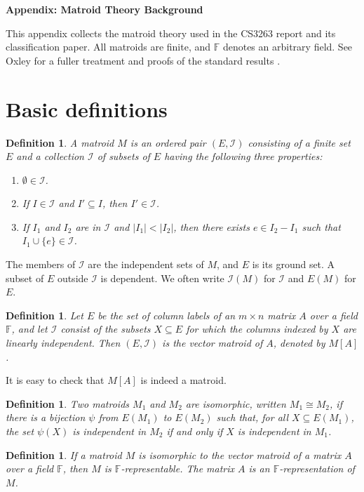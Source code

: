 \documentclass[11pt,letterpaper]{article}
\newcommand{\F}{\mathbb{F}}
\newcommand{\I}{\mathcal{I}}
\theoremstyle{appendix-result}
\theoremstyle{appendix-definition}
\newtheorem{definition}[theorem]{Definition}
\begin{document}
\begin{center}
    \Large\bfseries Appendix: Matroid Theory Background
\end{center}

This appendix collects the matroid theory used in the CS3263 report and its
classification paper. All matroids are finite, and \(\F\) denotes an arbitrary
field. See Oxley for a fuller treatment and proofs of the standard results
\cite{oxley-survey,oxley}.

\section{Basic definitions}
\begin{definition}
    A matroid $M$ is an ordered pair $(E, \I)$ consisting of a finite set $E$ and a collection $\I$ of subsets of $E$ having the following three properties:
    \begin{enumerate}
        \item $\emptyset \in \I$.
        \item If $I \in \I$ and $I' \subseteq I$, then $I' \in \I$.
        \item If $I_1$ and $I_2$ are in $\I$ and $|I_1| < |I_2|$, then there exists $e \in I_2 - I_1$ such that $I_1 \cup \{e\} \in \I$.
    \end{enumerate}
\end{definition}
The members of $\I$ are the independent sets of $M$, and $E$ is its ground set. A subset of $E$ outside $\I$ is dependent. We often write $\I(M)$ for $\I$ and $E(M)$ for $E$.
\begin{definition}
    Let $E$ be the set of column labels of an $m \times n$ matrix $A$ over a field $\F$, and let $\I$ consist of the subsets $X\subseteq E$ for which the columns indexed by $X$ are linearly independent. Then $(E, \I)$ is the vector matroid of $A$, denoted by $M[A]$.
\end{definition}
It is easy to check that $M[A]$ is indeed a matroid.
\begin{definition}
    Two matroids $M_1$ and $M_2$ are isomorphic, written $M_1 \cong M_2$, if there is a bijection $\psi$ from $E(M_1)$ to $E(M_2)$ such that, for all $X \subseteq E(M_1)$, the set $\psi(X)$ is independent in $M_2$ if and only if $X$ is independent in $M_1$.
\end{definition}
\begin{definition}
    If a matroid $M$ is isomorphic to the vector matroid of a matrix $A$ over a field $\F$, then $M$ is $\F$-representable. The matrix $A$ is an $\F$-representation of $M$.
\end{definition}
\end{document}
